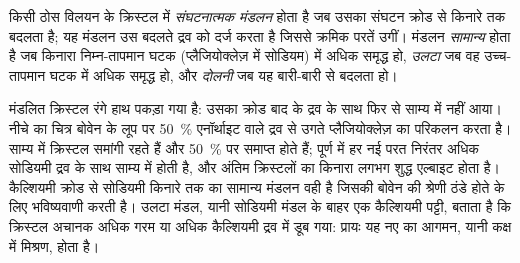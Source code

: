 \begin{definition}\label{def:b2:magmatic-differentiation:zoning}
किसी ठोस विलयन के क्रिस्टल में \emph{संघटनात्मक मंडलन}
होता है जब उसका संघटन क्रोड से किनारे तक बदलता है; यह मंडलन उस बदलते द्रव को दर्ज करता है
जिससे क्रमिक परतें उगीं। मंडलन \emph{सामान्य} होता है जब किनारा
निम्न-तापमान घटक (प्लैजियोक्लेज़ में सोडियम) में अधिक समृद्ध हो, \emph{उलटा} जब वह
उच्च-तापमान घटक में अधिक समृद्ध हो, और \emph{दोलनी} जब यह बारी-बारी से बदलता हो।
\end{definition}

मंडलित क्रिस्टल रंगे हाथ पकड़ा गया  है: उसका क्रोड
बाद के द्रव के साथ फिर से साम्य में नहीं आया। नीचे का चित्र बोवेन के लूप पर
\qty{50}{\percent} एनॉर्थाइट वाले द्रव से उगते प्लैजियोक्लेज़ का परिकलन करता है।
साम्य में क्रिस्टल समांगी रहते हैं और \qty{50}{\percent} पर समाप्त होते हैं; पूर्ण
 में हर नई परत निरंतर अधिक सोडियमी द्रव के साथ साम्य में होती है,
और अंतिम क्रिस्टलों का किनारा लगभग शुद्ध एल्बाइट होता है। कैल्शियमी क्रोड से सोडियमी किनारे तक का
सामान्य मंडलन वही है जिसकी बोवेन की श्रेणी ठंडे होते  के लिए भविष्यवाणी करती है। उलटा
मंडल, यानी सोडियमी मंडल के बाहर एक कैल्शियमी पट्टी, बताता है कि क्रिस्टल अचानक
अधिक गरम या अधिक कैल्शियमी द्रव में डूब गया: प्रायः यह नए  का आगमन, यानी कक्ष में
मिश्रण, होता है।

